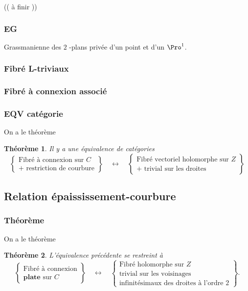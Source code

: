 \documentclass[a4paper]{amsart}
\newtheorem{thm}{Théorème}
\begin{document}
(( à finir ))

\subsubsection{EG}
\label{sec:org17e1650}

Grassmanienne des \(2\) -plans privée d'un point et d'un \(\Pro^1\).

\subsubsection{Fibré L-triviaux}
\label{sec:orgd66319b}

\subsubsection{Fibré à connexion associé}
\label{sec:orgce4864b}

\subsubsection{EQV catégorie}
\label{sec:orgb482355}
On a le théorème
\begin{thm}
Il y a une équivalence de catégories
\begin{equation*}
\left\lbrace
\begin{matrix}
\text{Fibré à connexion sur }C \\
+ \text{ restriction de courbure}
\end{matrix}
\right\rbrace \quad \leftrightarrow \quad \left\lbrace
\begin{matrix}
\text{Fibré vectoriel holomorphe sur }Z\\
+ \text{ trivial sur les droites}
\end{matrix}
\right\rbrace
\end{equation*}
\end{thm}

\subsection{Relation épaississement-courbure}
\label{sec:org86752ed}

\subsubsection{Théorème}
\label{sec:org1c35106}
On a le théorème
\begin{thm}
L'équivalence précédente se restreint à
\begin{equation*}
\left\lbrace
\begin{matrix}
\text{Fibré à connexion}\\
\textbf{plate} \text{ sur } C
\end{matrix}
\right\rbrace \quad \leftrightarrow \quad \left\lbrace
\begin{matrix}
\text{Fibré holomorphe sur }Z\\
\text{trivial sur les voisinages}\\
\text{infinitésimaux des droites à l'ordre }2
\end{matrix}
\right\rbrace.
\end{equation*}
\end{thm}
\end{document}
